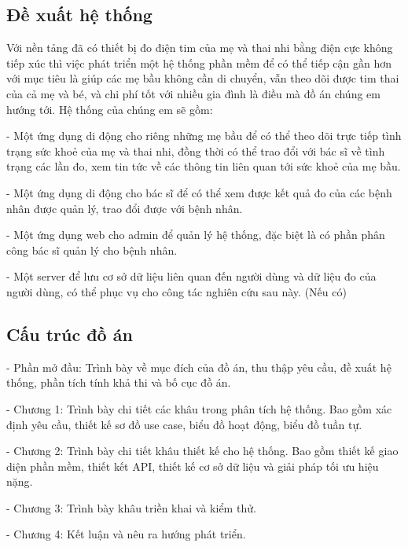 \subsection*{Đề xuất hệ thống}
Với nền tảng đã có thiết bị đo điện tim của mẹ và thai nhi bằng điện cực không tiếp xúc thì việc phát triển một hệ thống
phần mềm để có thể tiếp cận gần hơn với mục tiêu là giúp các mẹ bầu không cần di chuyển, vẫn theo dõi được tim thai của
cả mẹ và bé, và chi phí tốt với nhiều gia đình là điều mà đồ án chúng em hướng tới. Hệ thống của chúng em sẽ gồm:

- Một ứng dụng di động cho riêng những mẹ bầu để có thể theo dõi trực tiếp tình trạng sức khoẻ của mẹ và thai nhi, đồng
thời có thể trao đổi với bác sĩ về tình trạng các lần đo, xem tin tức về các thông tin liên quan tới sức khoẻ của mẹ bầu.

- Một ứng dụng di động cho bác sĩ để có thể xem được kết quả đo của các bệnh nhân được quản lý, trao đổi được với bệnh nhân.

- Một ứng dụng web cho admin để quản lý hệ thống, đặc biệt là có phần phân công bác sĩ quản lý cho bệnh nhân.

- Một server để lưu cơ sở dữ liệu liên quan đến người dùng và dữ liệu đo của người dùng, có thể phục vụ cho công tác nghiên cứu
sau này.
(Nếu có) \cite{nhu2019effects}

\subsection*{Cấu trúc đồ án}
- Phần mở đầu: Trình bày về mục đích của đồ án, thu thập yêu cầu, đề xuất hệ thống, phần tích tính khả thi và bố cục đồ án.

- Chương 1: Trình bày chi tiết các khâu trong phân tích hệ thống. 
Bao gồm xác định yêu cầu, thiết kế sơ đồ use case, biểu đồ hoạt động, biểu đồ tuần tự.

- Chương 2: Trình bày chi tiết khâu thiết kế cho hệ thống. Bao gồm thiết kế giao diện phần mềm, thiết kết API, thiết kế cơ sở dữ liệu
và giải pháp tối ưu hiệu nặng.

- Chương 3: Trình bày khâu triền khai và kiểm thử.

- Chương 4: Kết luận và nêu ra hướng phát triển.
\cleardoublepage

